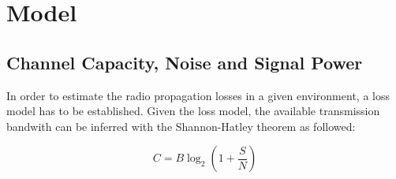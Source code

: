 \graphicspath{{figures/}}


\chapter{Model}\label{chap:model}

\section{Channel Capacity, Noise and Signal Power}
In order to estimate the radio propagation losses in a given environment, 
a loss model has to be established. Given the loss model, the available 
transmission bandwith can be inferred with the Shannon-Hatley theorem \cite{hartley1928transmission} as followed: 

\begin{equation} \label{eq:capacity}
    C = B \log_2(1 + \frac{S}{N})
\end{equation}

